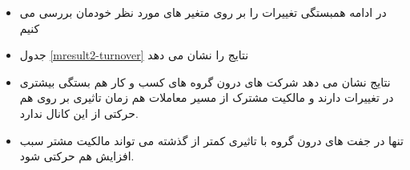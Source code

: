 \documentclass[12pt, a4paper]{article}
\begin{document}
\begin{itemize}
	\item 
	در ادامه همبستگی تغییرات 
	را بر روی متغیر های مورد نظر خودمان بررسی می کنیم
	\item 
	جدول
	\ref{mresult2-turnover}
	نتایج را نشان می دهد
	\begin{LTR}
	\end{LTR}
	\item 
	نتایج نشان می دهد شرکت های درون گروه های کسب و کار هم بستگی بیشتری در تغییرات
	دارند و مالکیت مشترک از مسیر معاملات هم زمان تاثیری بر روی هم حرکتی از این کانال ندارد.
	\item
	تنها در جفت های درون گروه با تاثیری کمتر از گذشته می تواند مالکیت مشتر سبب افزایش هم حرکتی شود.
	
\end{itemize}





\FloatBarrier


 \subsection{}
\end{document}
